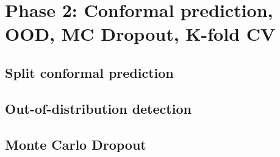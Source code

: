 \chapter{Phase 2: Conformal prediction, OOD, MC Dropout, K-fold CV}
\label{ch:phase2}


\section{Split conformal prediction}



\section{Out-of-distribution detection}
%

\section{Monte Carlo Dropout}

